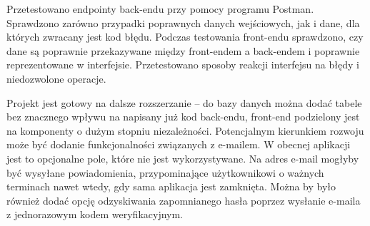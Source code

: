 \documentclass[a4paper,twoside,12pt]{book}
\begin{document}
Przetestowano endpointy back-endu przy pomocy programu Postman. Sprawdzono zarówno przypadki poprawnych danych wejściowych, jak i dane, dla których zwracany jest kod błędu. Podczas testowania front-endu sprawdzono, czy dane są poprawnie przekazywane między front-endem a back-endem i poprawnie reprezentowane w interfejsie. Przetestowano sposoby reakcji interfejsu na błędy i niedozwolone operacje. 

Projekt jest gotowy na dalsze rozszerzanie -- do bazy danych można dodać tabele bez znacznego wpływu na napisany już kod back-endu, front-end podzielony jest na komponenty o dużym stopniu niezależności. Potencjalnym kierunkiem rozwoju może być dodanie funkcjonalności związanych z e-mailem. W obecnej aplikacji jest to opcjonalne pole, które nie jest wykorzystywane. Na adres e-mail mogłyby być wysyłane powiadomienia, przypominające użytkownikowi o ważnych terminach nawet wtedy, gdy sama aplikacja jest zamknięta. Można by było również dodać opcję odzyskiwania zapomnianego hasła poprzez wysłanie e-maila z jednorazowym kodem weryfikacyjnym.


\backmatter

\printbibliography           %
\end{document}
